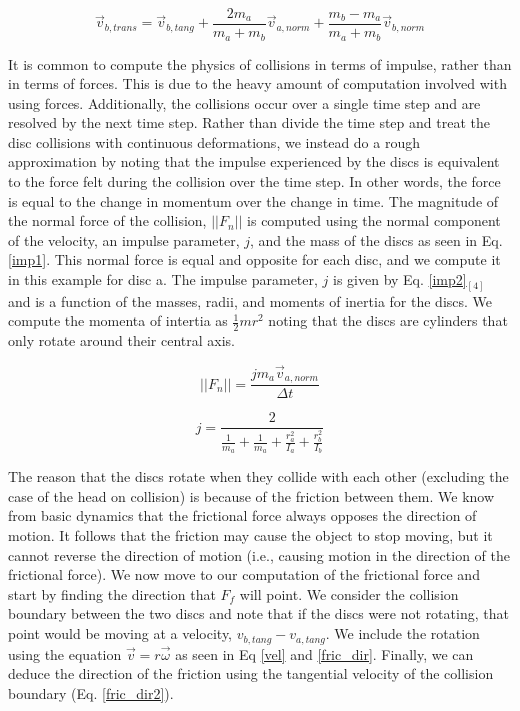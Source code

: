 \documentclass[pdftext,twoside,10pt]{article}
\begin{document}
\begin{equation}
\vec{v}_{b, trans} = \vec{v}_{b,tang} + \frac{2m_a}{m_a+m_b}\vec{v}_{a,norm} +  \frac{m_b - m_a}{m_a+m_b}\vec{v}_{b,norm}
 \label{elast2}
\end{equation}

It is common to compute the physics of collisions in terms of impulse, rather than in terms of forces. This is due to the heavy amount of computation involved with using forces. Additionally, the collisions occur over a single time step and are resolved by the next time step. Rather than divide the time step and treat the disc collisions with continuous deformations, we instead do a rough approximation by noting that the impulse experienced by the discs is equivalent to the force felt during the collision over the time step. In other words, the force is equal to the change in momentum over the change in time. The magnitude of the normal force of the collision, $||F_n||$ is computed using the normal component of the velocity, an impulse parameter, $j$, and the mass of the discs as seen in Eq. \ref{imp1}. This normal force is equal and opposite for each disc, and we compute it in this example for disc a. The impulse parameter, $j$ is given by Eq. \ref{imp2}$_{[4]}$ and is a function of the masses, radii, and moments of inertia for the discs. We compute the momenta of intertia as $\frac{1}{2}mr^2$ noting that the discs are cylinders that only rotate around their central axis.

\begin{equation}
||F_n|| = \frac{jm_a\vec{v}_{a,norm} }{\Delta t}
 \label{imp1}
\end{equation}

\begin{equation}
j = \frac{2}{ \frac{1}{m_a} + \frac{1}{m_a} + \frac{r_a^2}{I_a} + \frac{r_b^2}{I_b} }
 \label{imp2}
\end{equation}

The reason that the discs rotate when they collide with each other (excluding the case of the head on collision) is because of the friction between them. We know from basic dynamics that the frictional force always opposes the direction of motion. It follows that the friction may cause the object to stop moving, but it cannot reverse the direction of motion (i.e., causing motion in the direction of the frictional force). We now move to our computation of the frictional force and start by finding the direction that $F_f$ will point. We consider the collision boundary between the two discs and note that if the discs were not rotating, that point would be moving at a velocity, $v_{b,tang} - v_{a,tang}$. We include the rotation using the equation $\vec{v} = r\vec{\omega}$ as seen in Eq \ref{vel} and \ref{fric_dir}. Finally, we can deduce the direction of the friction using the tangential velocity of the collision boundary (Eq. \ref{fric_dir2}). 
\end{document}
